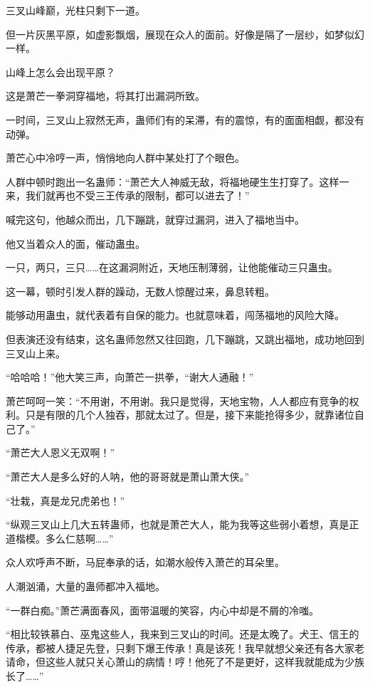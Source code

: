 
\begin{this_body}



三叉山峰巅，光柱只剩下一道。

但一片灰黑平原，如虚影飘烟，展现在众人的面前。好像是隔了一层纱，如梦似幻一样。

山峰上怎么会出现平原？

这是萧芒一拳洞穿福地，将其打出漏洞所致。

一时间，三叉山上寂然无声，蛊师们有的呆滞，有的震惊，有的面面相觑，都没有动弹。

萧芒心中冷哼一声，悄悄地向人群中某处打了个眼色。

人群中顿时跑出一名蛊师：“萧芒大人神威无敌，将福地硬生生打穿了。这样一来，我们就再也不受三王传承的限制，都可以进去了！”

喊完这句，他越众而出，几下蹦跳，就穿过漏洞，进入了福地当中。

他又当着众人的面，催动蛊虫。

一只，两只，三只……在这漏洞附近，天地压制薄弱，让他能催动三只蛊虫。

这一幕，顿时引发人群的躁动，无数人惊醒过来，鼻息转粗。

能够动用蛊虫，就代表着有自保的能力。也就意味着，闯荡福地的风险大降。

但表演还没有结束，这名蛊师忽然又往回跑，几下蹦跳，又跳出福地，成功地回到三叉山上来。

“哈哈哈！”他大笑三声，向萧芒一拱拳，“谢大人通融！”

萧芒呵呵一笑：“不用谢，不用谢。我只是觉得，天地宝物，人人都应有竞争的权利。只是有限的几个人独吞，那就太过了。但是，接下来能抢得多少，就靠诸位自己了。”

“萧芒大人恩义无双啊！”

“萧芒大人是多么好的人呐，他的哥哥就是萧山萧大侠。”

“壮栽，真是龙兄虎弟也！”

“纵观三叉山上几大五转蛊师，也就是萧芒大人，能为我等这些弱小着想，真是正道楷模。多么仁慈啊……”

众人欢呼声不断，马屁奉承的话，如潮水般传入萧芒的耳朵里。

人潮汹涌，大量的蛊师都冲入福地。

“一群白痴。”萧芒满面春风，面带温暖的笑容，内心中却是不屑的冷嗤。

“相比较铁慕白、巫鬼这些人，我来到三叉山的时间。还是太晚了。犬王、信王的传承，都被人捷足先登，只剩下爆王传承！真是该死！我早就想父亲还有各大家老请命，但这些人就只关心萧山的病情！哼！他死了不是更好，这样我就能成为少族长了……”


\end{this_body}
